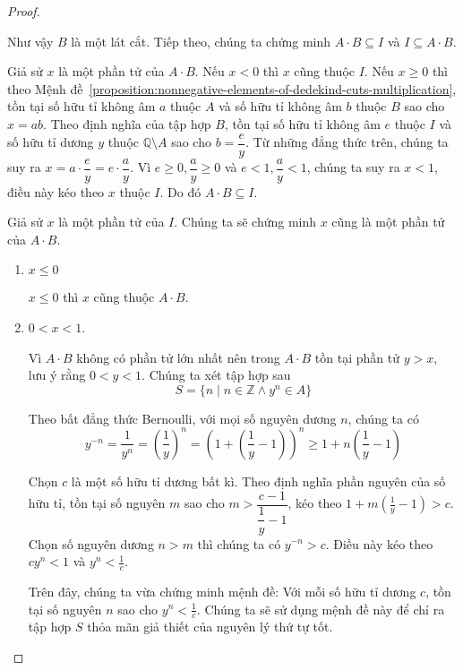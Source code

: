 \begin{proof}
\begin{enumerate}[label={\textbf{Trường hợp \arabic*.}},itemindent=2cm]
              Như vậy $B$ là một lát cắt. Tiếp theo, chúng ta chứng minh $A\cdot B \subseteq I$ và $I\subseteq A\cdot B$.

              \bigskip

              Giả sử $x$ là một phần tử của $A\cdot B$. Nếu $x < 0$ thì $x$ cũng thuộc $I$. Nếu $x\geq 0$ thì theo Mệnh đề~\ref{proposition:nonnegative-elements-of-dedekind-cuts-multiplication}, tồn tại số hữu tỉ không âm $a$ thuộc $A$ và số hữu tỉ không âm $b$ thuộc $B$ sao cho $x = ab$. Theo định nghĩa của tập hợp $B$, tồn tại số hữu tỉ không âm $e$ thuộc $I$ và số hữu tỉ dương $y$ thuộc $\mathbb{Q}\setminus A$ sao cho $b = \dfrac{e}{y}$. Từ những đẳng thức trên, chúng ta suy ra $x = a\cdot\dfrac{e}{y} = e\cdot\dfrac{a}{y}$. Vì $e\geq 0, \dfrac{a}{y}\geq 0$ và $e < 1, \dfrac{a}{y} < 1$, chúng ta suy ra $x < 1$, điều này kéo theo $x$ thuộc $I$. Do đó $A\cdot B \subseteq I$.
              \bigskip

              Giả sử $x$ là một phần tử của $I$. Chúng ta sẽ chứng minh $x$ cũng là một phần tử của $A\cdot B$.
              \begin{enumerate}[label={\textbf{Khả năng \arabic*.}},itemindent=1.5cm]
                  \item $x\leq 0$

                        $x\leq 0$ thì $x$ cũng thuộc $A\cdot B$.
                  \item $0 < x < 1$.

                        Vì $A\cdot B$ không có phần tử lớn nhất nên trong $A\cdot B$ tồn tại phần tử $y > x$, lưu ý rằng $0 < y < 1$. Chúng ta xét tập hợp sau
                        \[
                            S = \{ n \mid n\in\mathbb{Z} \wedge y^{n}\in A \}
                        \]

                        Theo bất đẳng thức Bernoulli, với mọi số nguyên dương $n$, chúng ta có
                        \[
                            y^{-n} = \dfrac{1}{y^{n}} = {\left(\frac{1}{y}\right)}^{n} = {\left(1 + \left(\frac{1}{y} - 1\right)\right)}^{n}\geq 1 + n\left(\frac{1}{y} - 1\right)
                        \]

                        Chọn $c$ là một số hữu tỉ dương bất kì. Theo định nghĩa phần nguyên của số hữu tỉ, tồn tại số nguyên $m$ sao cho $m > \dfrac{c - 1}{\dfrac{1}{y} - 1}$, kéo theo $1 + m\left(\frac{1}{y} - 1\right) > c$. Chọn số nguyên dương $n > m$ thì chúng ta có $y^{-n} > c$. Điều này kéo theo $cy^{n} < 1$ và $y^{n} < \frac{1}{c}$.

                        Trên đây, chúng ta vừa chứng minh mệnh đề: Với mỗi số hữu tỉ dương $c$, tồn tại số nguyên $n$ sao cho $y^{n} < \frac{1}{c}$. Chúng ta sẽ sử dụng mệnh đề này để chỉ ra tập hợp $S$ thỏa mãn giả thiết của nguyên lý thứ tự tốt.


\end{enumerate}
\end{enumerate}
\end{proof}
